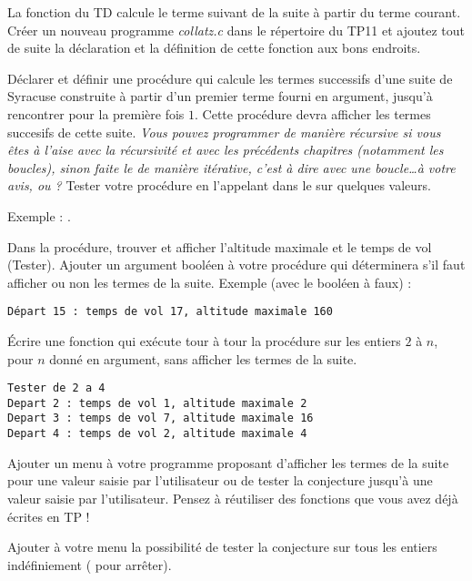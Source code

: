 \begin{newenu}

\item La fonction  du TD calcule le terme suivant de la suite à partir du terme courant. Créer un nouveau programme \emph{collatz.c} dans le répertoire du TP11 et ajoutez tout de suite la déclaration et la définition de cette fonction aux bons endroits.


\item Déclarer et définir une procédure  qui calcule les termes successifs d'une suite de Syracuse construite à partir d'un premier terme fourni en argument, jusqu'à rencontrer pour la première fois $1$. Cette procédure devra afficher les termes succesifs de cette suite. \emph{Vous pouvez programmer de manière récursive si vous êtes à l'aise avec la récursivité et avec les précédents chapitres (notamment les boucles), sinon faite le de manière itérative, c'est à dire avec une boucle\ldots à votre avis,  ou  ?} Tester votre procédure en l'appelant dans le  sur quelques valeurs. 

Exemple : .

\item Dans la procédure, trouver et afficher l'altitude maximale  et le temps de vol (Tester). Ajouter un argument booléen à votre procédure  qui déterminera s'il faut afficher ou non les termes de la suite. Exemple (avec le booléen à faux) : 

\begin{verbatim}
Départ 15 : temps de vol 17, altitude maximale 160
\end{verbatim}


\item Écrire une fonction  qui exécute tour à tour la procédure
   sur les entiers $2$ à $n$, pour $n$ donné en argument, sans afficher les termes de la suite.

\begin{verbatim}
Tester de 2 a 4
Depart 2 : temps de vol 1, altitude maximale 2
Depart 3 : temps de vol 7, altitude maximale 16
Depart 4 : temps de vol 2, altitude maximale 4
\end{verbatim}

\item Ajouter un menu à votre programme proposant d'afficher les termes de la suite pour une valeur saisie par l'utilisateur ou de tester la conjecture jusqu'à une valeur saisie par l'utilisateur. Pensez à réutiliser des fonctions que vous avez déjà écrites en TP !
\item Ajouter à votre menu la possibilité de tester la conjecture sur tous les entiers indéfiniement ( pour arrêter).
\end{newenu}

